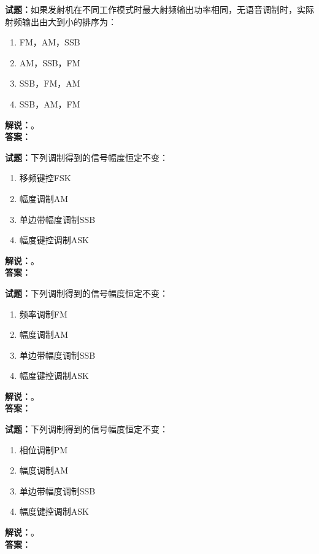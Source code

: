 \documentclass{ctexbook}
\begin{document}
\bigskip

\noindent\textbf{试题：}如果发射机在不同工作模式时最大射频输出功率相同，无语音调制时，实际射频输出由大到小的排序为：
\begin{enumerate}[leftmargin=3em]
  \item FM，AM，SSB
  \item AM，SSB，FM
  \item SSB，FM，AM
  \item SSB，AM，FM
\end{enumerate}
\noindent\textbf{解说：}\textbf{}。\\\noindent\textbf{答案：}

\bigskip

\noindent\textbf{试题：}下列调制得到的信号幅度恒定不变：
\begin{enumerate}[leftmargin=3em]
  \item 移频键控FSK
  \item 幅度调制AM
  \item 单边带幅度调制SSB
  \item 幅度键控调制ASK
\end{enumerate}
\noindent\textbf{解说：}\textbf{}。\\\noindent\textbf{答案：}

\bigskip

\noindent\textbf{试题：}下列调制得到的信号幅度恒定不变：
\begin{enumerate}[leftmargin=3em]
  \item 频率调制FM
  \item 幅度调制AM
  \item 单边带幅度调制SSB
  \item 幅度键控调制ASK
\end{enumerate}
\noindent\textbf{解说：}\textbf{}。\\\noindent\textbf{答案：}

\bigskip

\noindent\textbf{试题：}下列调制得到的信号幅度恒定不变：
\begin{enumerate}[leftmargin=3em]
  \item 相位调制PM
  \item 幅度调制AM
  \item 单边带幅度调制SSB
  \item 幅度键控调制ASK
\end{enumerate}
\noindent\textbf{解说：}\textbf{}。\\\noindent\textbf{答案：}

\bigskip
\end{document}
